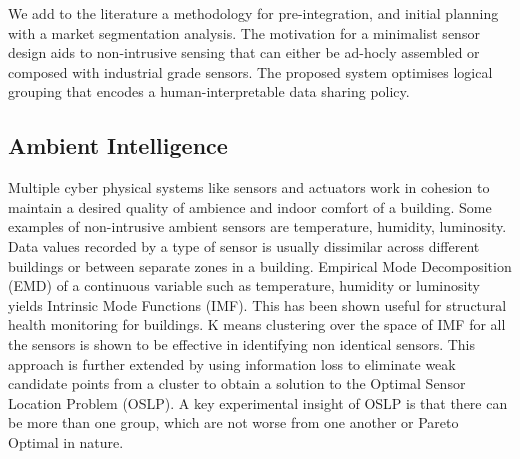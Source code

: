 We add to the literature a methodology for pre-integration, and initial planning with a market segmentation analysis. 
The motivation for a minimalist sensor design aids to non-intrusive sensing that can either be ad-hocly assembled or composed with industrial grade sensors.
The proposed system optimises logical grouping that encodes a human-interpretable data sharing policy.





\subsection{Ambient Intelligence}

Multiple cyber physical systems like sensors and actuators work in cohesion to maintain a desired quality of ambience and indoor comfort of a building.
Some examples of non-intrusive ambient sensors are temperature, humidity, luminosity.
Data values recorded by a type of sensor is usually dissimilar across different buildings or between separate zones in a building.
Empirical Mode Decomposition (EMD) \cite{fontugne2012empirical} of a continuous variable such as temperature, humidity or luminosity yields Intrinsic Mode Functions (IMF)\cite{ayenu2010criterion}.
This has been shown useful for structural health monitoring  \cite{barbosh2020empirical} for buildings.
K means clustering over the space of IMF for all the sensors is shown to be effective \cite{hong2013towards} in identifying non identical sensors.
This approach is further extended \cite{YOGANATHAN20181206}  by using information loss to eliminate weak candidate points from a cluster to obtain a solution to the Optimal Sensor Location Problem (OSLP).
A key experimental insight of OSLP  is that there can be more than one group, which are not worse from one another or Pareto Optimal \cite{censor1977pareto} in nature.

